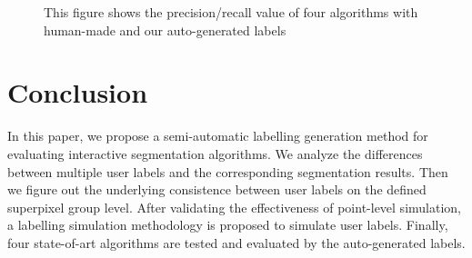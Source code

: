 \documentclass[runningheads,a4paper]{llncs}
\begin{document}
\begin{figure}[!tb]
{}
\caption{This figure shows the precision/recall value of four algorithms with human-made and our auto-generated labels }
\label{fig:pr boxplot}
\end{figure}


\section{Conclusion}
In this paper, we propose a semi-automatic labelling generation method for evaluating interactive segmentation algorithms. We analyze the differences between multiple user labels and the corresponding segmentation results. Then we figure out the underlying consistence between user labels on the defined superpixel group level. After validating the effectiveness of point-level simulation, a labelling simulation methodology is proposed to simulate user labels. Finally, four state-of-art algorithms are tested and evaluated by the auto-generated labels.
\end{document}
